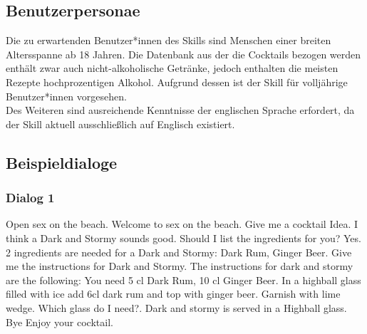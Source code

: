 \documentclass[12pt,letterpaper]{article}
\begin{document}
\subsection{Benutzerpersonae}
Die zu erwartenden Benutzer*innen des Skills sind Menschen einer breiten Altersspanne ab 18 Jahren. Die Datenbank aus der die Cocktails bezogen werden enthält zwar auch nicht-alkoholische Getränke, jedoch enthalten die meisten Rezepte hochprozentigen Alkohol. Aufgrund dessen ist der Skill für volljährige Benutzer*innen vorgesehen. \\Des Weiteren sind ausreichende Kenntnisse der englischen Sprache erfordert, da der Skill aktuell ausschließlich auf Englisch existiert.


\subsection{Beispieldialoge}
\subsubsection{Dialog 1}
\begin{dialogue}
	 Open sex on the beach.
	 Welcome to sex on the beach.
	 Give me a cocktail Idea.
	 I think a Dark and Stormy sounds good. Should I list the ingredients for you?
	 Yes.
	 2 ingredients are needed for a Dark and Stormy: Dark Rum, Ginger Beer.
	 Give me the instructions for Dark and Stormy.
	 The instructions for dark and stormy are the following: You need 5 cl Dark Rum, 10 cl Ginger Beer. In a highball glass filled with ice add 6cl dark rum and top with ginger beer. Garnish with lime wedge.
	 Which glass do I need?.
	 Dark and stormy is served in a Highball glass.
	 Bye
	 Enjoy your cocktail.
\end{dialogue}
\end{document}
